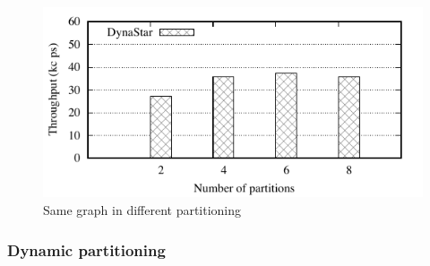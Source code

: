 \begin{figure}[t]
	\includegraphics{figures/experiments/throughput-avg-vary-partition}
	\caption{Same graph in different partitioning}
	\label{fig:4p1p_varying_partition_size}
\end{figure}


\subsubsection{Dynamic partitioning}




\label{sec:evaluation:strongloc}


